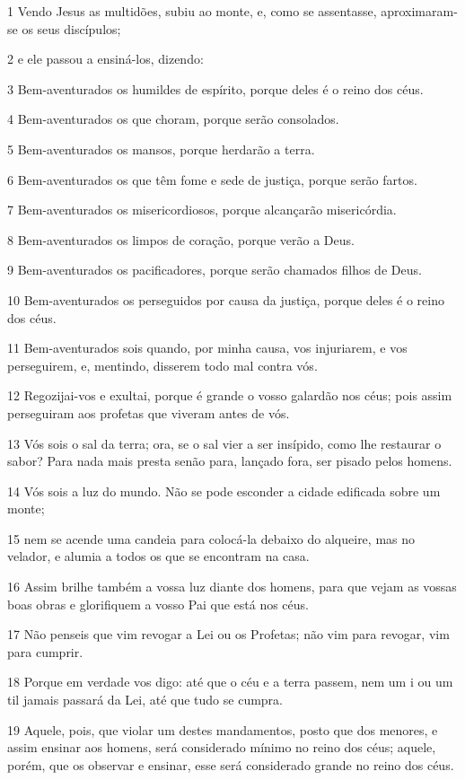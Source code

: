 \par 1 Vendo Jesus as multidões, subiu ao monte, e, como se assentasse, aproximaram-se os seus discípulos;
\par 2 e ele passou a ensiná-los, dizendo:
\par 3 Bem-aventurados os humildes de espírito, porque deles é o reino dos céus.
\par 4 Bem-aventurados os que choram, porque serão consolados.
\par 5 Bem-aventurados os mansos, porque herdarão a terra.
\par 6 Bem-aventurados os que têm fome e sede de justiça, porque serão fartos.
\par 7 Bem-aventurados os misericordiosos, porque alcançarão misericórdia.
\par 8 Bem-aventurados os limpos de coração, porque verão a Deus.
\par 9 Bem-aventurados os pacificadores, porque serão chamados filhos de Deus.
\par 10 Bem-aventurados os perseguidos por causa da justiça, porque deles é o reino dos céus.
\par 11 Bem-aventurados sois quando, por minha causa, vos injuriarem, e vos perseguirem, e, mentindo, disserem todo mal contra vós.
\par 12 Regozijai-vos e exultai, porque é grande o vosso galardão nos céus; pois assim perseguiram aos profetas que viveram antes de vós.
\par 13 Vós sois o sal da terra; ora, se o sal vier a ser insípido, como lhe restaurar o sabor? Para nada mais presta senão para, lançado fora, ser pisado pelos homens.
\par 14 Vós sois a luz do mundo. Não se pode esconder a cidade edificada sobre um monte;
\par 15 nem se acende uma candeia para colocá-la debaixo do alqueire, mas no velador, e alumia a todos os que se encontram na casa.
\par 16 Assim brilhe também a vossa luz diante dos homens, para que vejam as vossas boas obras e glorifiquem a vosso Pai que está nos céus.
\par 17 Não penseis que vim revogar a Lei ou os Profetas; não vim para revogar, vim para cumprir.
\par 18 Porque em verdade vos digo: até que o céu e a terra passem, nem um i ou um til jamais passará da Lei, até que tudo se cumpra.
\par 19 Aquele, pois, que violar um destes mandamentos, posto que dos menores, e assim ensinar aos homens, será considerado mínimo no reino dos céus; aquele, porém, que os observar e ensinar, esse será considerado grande no reino dos céus.

